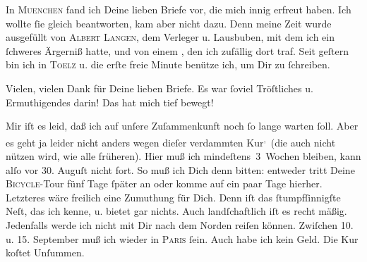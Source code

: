 \pstart
           In \textsc{Muenchen} fand ich Deine lieben Briefe vor, die mich innig erfreut haben. Ich wollte ſie
               gleich beantworten, kam aber nicht dazu. Denn meine Zeit wurde ausgefüllt von \textsc{Albert Langen}, dem Verleger u. Lausbuben, mit dem ich ein
               ſchweres Ärgerniß hatte, und von einem \label{K_L02743-1v}\label{K_L02743-1}, den ich
               zufällig dort traf. Seit geſtern bin ich in \textsc{Toelz} u. die erſte freie Minute benütze ich, um Dir zu ſchreiben.\pend
           
\pstart
           Vielen, vielen Dank für Deine lieben Briefe. Es war ſoviel Tröſtliches u.
               Ermuthigendes darin! Das hat mich tief bewegt! {\dotsfive}\pend
           
\pstart
           Mir iſt es leid, daß ich auf unſere Zuſammenkunft noch ſo lange warten {\pb}ſoll. Aber es geht ja leider nicht anders wegen
               dieſer verdammten Kur\substVorne{}\textsuperscript{,}\substDazwischen{} (\substHinten{}die auch nicht nützen wird, wie alle früheren). Hier muß ich
               mindeſtens 3 Wochen bleiben, kann alſo vor 30.{ }Auguſt nicht fort. So muß ich Dich denn bitten: entweder
               tritt Deine \textsc{Bicycle}-Tour fünf Tage ſpäter an {\pb}oder komme auf ein paar Tage hierher. Letzteres wäre
               freilich eine  Zumuthung für Dich. Denn \label{K_L02743-2v}\label{K_L02743-2} iſt das ſtumpfſinnigſte Neſt, das ich kenne, u.  bietet gar nichts. Auch landſchaftlich iſt es recht
               mäßig. Jedenfalls werde ich nicht mit Dir nach dem Norden reiſen können. Zwiſchen
                  10. u. 15. September{ }{\pb}muß ich wieder in \textsc{Paris} ſein. Auch habe ich kein Geld. Die Kur koſtet Unſummen.\pend
           
